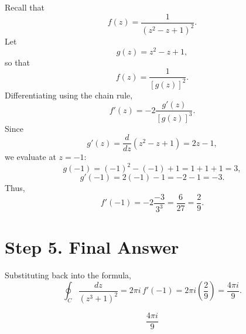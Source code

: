 \documentclass[12pt]{article}
\theoremstyle{definition} %
\theoremstyle{plain} %
\begin{document}
Recall that
\[
f(z) = \frac{1}{\left(z^2-z+1\right)^2}.
\]
Let
\[
g(z)=z^2-z+1,
\]
so that
\[
f(z) = \frac{1}{[g(z)]^2}.
\]
Differentiating using the chain rule,
\[
f'(z) = -2 \frac{g'(z)}{[g(z)]^3}.
\]
Since
\[
g'(z)=\frac{d}{dz}(z^2-z+1)=2z-1,
\]
we evaluate at \( z=-1 \):
\[
g(-1)=(-1)^2-(-1)+1=1+1+1=3,
\]
\[
g'(-1)=2(-1)-1=-2-1=-3.
\]
Thus,
\[
f'(-1) = -2\frac{-3}{3^3} = \frac{6}{27} = \frac{2}{9}.
\]

\section*{Step 5. Final Answer}

Substituting back into the formula,
\[
\oint_C \frac{dz}{\left(z^3+1\right)^2} = 2\pi i\, f'(-1) = 2\pi i \left(\frac{2}{9}\right) = \frac{4\pi i}{9}.
\]

\[
\boxed{\frac{4\pi i}{9}}
\]
\end{document}
